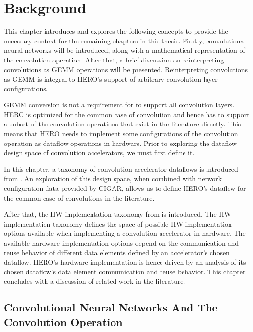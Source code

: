 \chapter{Background}
\label{chap:background:intro}

This chapter introduces and explores  the following concepts to provide the
necessary context for the remaining chapters in this thesis. Firstly,
convolutional neural networks will be introduced, along with a mathematical
representation of the convolution operation. After that, a brief discussion on
reinterpreting convolutions as GEMM operations will be presented. Reinterpreting
convolutions as GEMM is integral to HERO's support of arbitrary convolution
layer configurations. 

GEMM conversion is not a requirement for to support all convolution layers. HERO
is optimized for the common case of convolution and hence has to support a
subset of the convolution operations that exist in the literature directly. This
means that HERO needs to implement some configurations of the convolution
operation as dataflow operations in hardware. Prior to exploring the dataflow
design space of convolution accelerators, we must first define it. 

In this chapter, a taxonomy of convolution accelerator dataflows is introduced
from \cite{infamous_stanford}. An exploration of this design space, when
combined with network configuration data provided by CIGAR, allows us to define
HERO's dataflow for the common case of convolutions in the literature. 

After that, the HW implementation taxonomy from \cite{maestro} is introduced.
The HW implementation taxonomy defines the space of possible HW implementation
options available when implementing a convolution accelerator in hardware. The
available hardware implementation options depend on the communication and reuse
behavior of different data elements defined by an accelerator's chosen dataflow.
HERO's hardware implementation is hence driven by an analysis of its chosen
dataflow's data element communication and reuse behavior. This chapter concludes
with a discussion of related work in the literature.

\clearpage

\section{Convolutional Neural Networks And The Convolution Operation}
\label{chap:background:cnns_and_conv}

